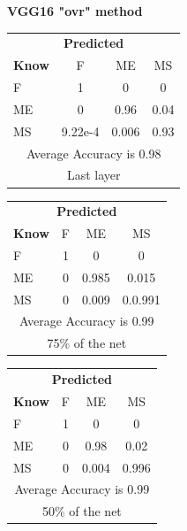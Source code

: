\documentclass[12pt]{article} %
\begin{document}
\begin{center}
\textbf{ VGG16  "ovr" method}
\end{center}
\begin{minipage}{0.5\textwidth}
\begin{center}
\begin{tabular}{l|c|c|c|}
 \multicolumn{4}{c}{ \textbf{ Predicted}}\\
 \textbf{Know}&F&ME&MS\\ \hline\hline
F   &1&0&0\\
ME &0&0.96&0.04\\
MS &9.22e-4&0.006&0.93\\
\multicolumn{4}{c}{Average Accuracy is 0.98}\\
\multicolumn{4}{c}{Last layer}\\
\end{tabular}
\end{center}
\end{minipage}
\begin{minipage}{0.5\textwidth}
\begin{center}
\begin{tabular}{l|c|c|c|}
 \multicolumn{4}{c}{ \textbf{ Predicted}}\\
 \textbf{Know}&F&ME&MS\\ \hline\hline
F   &1&0&0\\
ME &0&0.985&0.015\\
MS &0&0.009&0.0.991\\
\multicolumn{4}{c}{Average Accuracy is 0.99}\\
\multicolumn{4}{c}{75\%  of the net}\\
\end{tabular}
\end{center}
\end{minipage}
\begin{minipage}{0.5\textwidth}
\begin{center}
\begin{tabular}{l|c|c|c|}
 \multicolumn{4}{c}{ \textbf{ Predicted}}\\
 \textbf{Know}&F&ME&MS\\ \hline\hline
F   &1&0&0\\
ME &0&0.98&0.02\\
MS &0&0.004&0.996\\
\multicolumn{4}{c}{Average Accuracy is 0.99}\\
\multicolumn{4}{c}{50\%  of the net}\\
\end{tabular}
\end{center}
\end{minipage}
\end{document}
